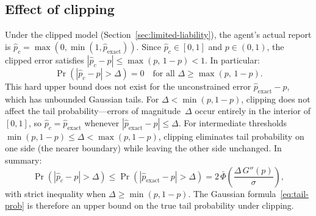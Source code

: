 \documentclass[11pt]{article}
\begin{document}
\subsection{Effect of clipping}

Under the clipped model (Section~\ref{sec:limited-liability}), the agent's actual report is $\hat{p}_c = \max(0, \min(1, \hat{p}_{\mathrm{exact}}))$. Since $\hat{p}_c \in [0,1]$ and $p \in (0,1)$, the clipped error satisfies $|\hat{p}_c - p| \leq \max(p,\, 1-p) < 1$. In particular:
\begin{equation}\label{eq:tail-clipping-bound}
\Pr(|\hat{p}_c - p| > \Delta) = 0 \quad \text{for all } \Delta \geq \max(p,\, 1-p).
\end{equation}
This hard upper bound does not exist for the unconstrained error $\hat{p}_{\mathrm{exact}} - p$, which has unbounded Gaussian tails. For $\Delta < \min(p, 1-p)$, clipping does not affect the tail probability---errors of magnitude~$\Delta$ occur entirely in the interior of $[0,1]$, so $\hat{p}_c = \hat{p}_{\mathrm{exact}}$ whenever $|\hat{p}_{\mathrm{exact}} - p| \leq \Delta$. For intermediate thresholds $\min(p, 1-p) \leq \Delta < \max(p, 1-p)$, clipping eliminates tail probability on one side (the nearer boundary) while leaving the other side unchanged. In summary:
\[
\Pr(|\hat{p}_c - p| > \Delta) \leq \Pr(|\hat{p}_{\mathrm{exact}} - p| > \Delta) = 2\,\bar{\Phi}\!\left(\frac{\Delta\,G''(p)}{\sigma}\right),
\]
with strict inequality when $\Delta \geq \min(p, 1-p)$. The Gaussian formula~\eqref{eq:tail-prob} is therefore an upper bound on the true tail probability under clipping.
\end{document}
